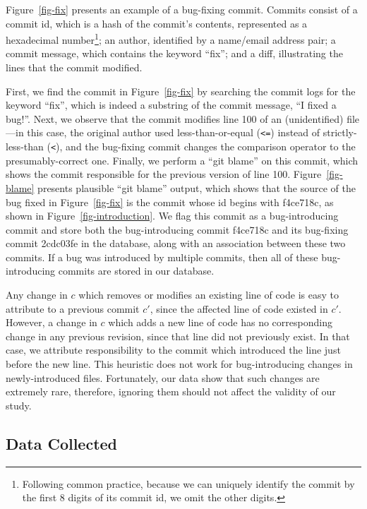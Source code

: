 Figure~\ref{fig-fix} presents an example of a bug-fixing commit. Commits
consist of a commit id, which is a hash of the commit's contents, represented as
a hexadecimal number\footnote{Following common practice, because we can uniquely
 identify the commit by the first 8 digits of its commit id, we omit the other
 digits.}; an author, identified by a name/email address pair; a commit
message, which contains the keyword ``fix''; and a diff, illustrating the lines
that the commit modified.


First, we find the commit in Figure~\ref{fig-fix} by searching the commit
logs for the keyword ``fix'', which is indeed a substring of the commit message,
``I fixed a bug!''. Next, we observe that the commit modifies line 100 of
an (unidentified) file---in this case, the original author used
less-than-or-equal (\verb+<=+) instead of strictly-less-than (\verb+<+), and the
bug-fixing commit changes the comparison operator to the presumably-correct one.
Finally, we perform a ``git blame'' on this commit, which shows the commit
responsible for the previous version of line 100. Figure~\ref{fig-blame}
presents plausible ``git blame'' output, which shows that the source of the bug
fixed in Figure~\ref{fig-fix} is the commit whose id begins with f4ce718c, as
shown in Figure~\ref{fig-introduction}. We flag this commit as a
bug-introducing commit and store both the bug-introducing commit f4ce718c and
its bug-fixing commit 2cdc03fe in the database, along with an association
between these two commits. If a bug was introduced by multiple commits, 
then all of these bug-introducing commits are stored in our database. 

Any change in $c$ which removes or modifies an existing line of code is easy to
attribute to a previous commit $c'$, since the affected line of code existed in
$c'$. However, a change in $c$ which adds a new line of code has no
corresponding change in any previous revision, since that line did not
previously exist. In that case, we attribute responsibility to the commit which
introduced the line just before the new line. This heuristic does not work for
bug-introducing changes in newly-introduced files. Fortunately, our data show
that such changes are extremely rare, therefore, ignoring them should not affect the validity of our study. 

\subsection{Data Collected}
\label{sec:data}

